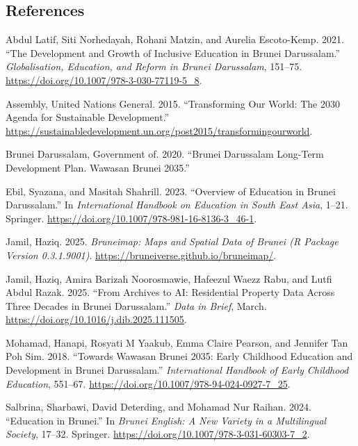 \documentclass[
  12pt,
]{article}
\newlength{\cslhangindent}
\newenvironment{CSLReferences}[2] %
 {\begin{list}{}{%
  \setlength{\itemindent}{0pt}
  \setlength{\leftmargin}{0pt}
  \setlength{\parsep}{0pt}
  \ifodd #1
   \setlength{\leftmargin}{\cslhangindent}
   \setlength{\itemindent}{-1\cslhangindent}
  \fi
  \setlength{\itemsep}{#2\baselineskip}}}
 {\end{list}}
\begin{document}
\subsection*{References}\label{references}

\label{refs}
\begin{CSLReferences}{1}{0}
Abdul Latif, Siti Norhedayah, Rohani Matzin, and Aurelia Escoto-Kemp.
2021. {``The Development and Growth of Inclusive Education in Brunei
Darussalam.''} \emph{Globalisation, Education, and Reform in Brunei
Darussalam}, 151--75. \url{https://doi.org/10.1007/978-3-030-77119-5_8}.

Assembly, United Nations General. 2015. {``Transforming Our World: The
2030 Agenda for Sustainable Development.''}
\url{https://sustainabledevelopment.un.org/post2015/transformingourworld}.

Brunei Darussalam, Government of. 2020. {``Brunei Darussalam Long-Term
Development Plan. Wawasan Brunei 2035.''}

Ebil, Syazana, and Masitah Shahrill. 2023. {``Overview of Education in
Brunei Darussalam.''} In \emph{International Handbook on Education in
South East Asia}, 1--21. Springer.
\url{https://doi.org/10.1007/978-981-16-8136-3_46-1}.

Jamil, Haziq. 2025. \emph{Bruneimap: {M}aps and {S}patial {D}ata of
{B}runei ({R} Package Version 0.3.1.9001)}.
\url{https://bruneiverse.github.io/bruneimap/}.

Jamil, Haziq, Amira Barizah Noorosmawie, Hafeezul Waezz Rabu, and Lutfi
Abdul Razak. 2025. {``From {Archives} to {AI:} {Residential} {Property}
{Data} {Across} {Three} {Decades} in {Brunei} {Darussalam}.''}
\emph{Data in Brief}, March.
\url{https://doi.org/10.1016/j.dib.2025.111505}.

Mohamad, Hanapi, Rosyati M Yaakub, Emma Claire Pearson, and Jennifer Tan
Poh Sim. 2018. {``Towards Wawasan Brunei 2035: Early Childhood Education
and Development in Brunei Darussalam.''} \emph{International Handbook of
Early Childhood Education}, 551--67.
\url{https://doi.org/10.1007/978-94-024-0927-7_25}.

Salbrina, Sharbawi, David Deterding, and Mohamad Nur Raihan. 2024.
{``Education in Brunei.''} In \emph{Brunei English: A New Variety in a
Multilingual Society}, 17--32. Springer.
\url{https://doi.org/10.1007/978-3-031-60303-7_2}.

\end{CSLReferences}
\end{document}
